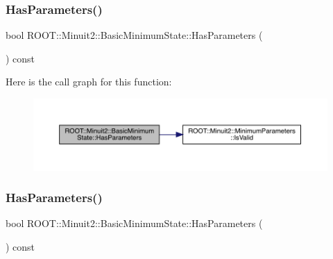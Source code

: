 \subsubsection{\texorpdfstring{HasParameters()}{HasParameters()}\hspace{0.1cm}{\footnotesize\ttfamily [2/3]}}
{\footnotesize\ttfamily bool R\+O\+O\+T\+::\+Minuit2\+::\+Basic\+Minimum\+State\+::\+Has\+Parameters (\begin{DoxyParamCaption}{ }\end{DoxyParamCaption}) const\hspace{0.3cm}{\ttfamily [inline]}}

Here is the call graph for this function\+:
\nopagebreak
\begin{figure}[H]
\begin{center}
\leavevmode
\includegraphics[width=350pt]{d0/db1/classROOT_1_1Minuit2_1_1BasicMinimumState_a1af83c0464c727dc173834c1612f5e49_cgraph}
\end{center}
\end{figure}
\mbox{\label{classROOT_1_1Minuit2_1_1BasicMinimumState_a1af83c0464c727dc173834c1612f5e49}} 
\subsubsection{\texorpdfstring{HasParameters()}{HasParameters()}\hspace{0.1cm}{\footnotesize\ttfamily [3/3]}}
{\footnotesize\ttfamily bool R\+O\+O\+T\+::\+Minuit2\+::\+Basic\+Minimum\+State\+::\+Has\+Parameters (\begin{DoxyParamCaption}{ }\end{DoxyParamCaption}) const\hspace{0.3cm}{\ttfamily [inline]}}

